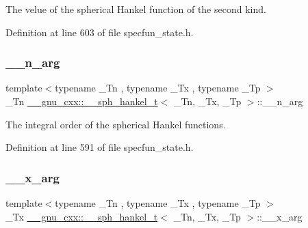 The velue of the spherical Hankel function of the second kind. 



Definition at line 603 of file specfun\+\_\+state.\+h.

\mbox{\label{struct____gnu__cxx_1_1____sph__hankel__t_a43f671e87375a9077262676564df20c5}} 
\subsubsection{\texorpdfstring{\+\_\+\+\_\+n\+\_\+arg}{\_\_n\_arg}}
{\footnotesize\ttfamily template$<$typename \+\_\+\+Tn , typename \+\_\+\+Tx , typename \+\_\+\+Tp $>$ \\
\+\_\+\+Tn \hyperlink{struct____gnu__cxx_1_1____sph__hankel__t}{\+\_\+\+\_\+gnu\+\_\+cxx\+::\+\_\+\+\_\+sph\+\_\+hankel\+\_\+t}$<$ \+\_\+\+Tn, \+\_\+\+Tx, \+\_\+\+Tp $>$\+::\+\_\+\+\_\+n\+\_\+arg}



The integral order of the spherical Hankel functions. 



Definition at line 591 of file specfun\+\_\+state.\+h.

\mbox{\label{struct____gnu__cxx_1_1____sph__hankel__t_a265ee0cdcca2d491c29b520a0fd4e4b3}} 
\subsubsection{\texorpdfstring{\+\_\+\+\_\+x\+\_\+arg}{\_\_x\_arg}}
{\footnotesize\ttfamily template$<$typename \+\_\+\+Tn , typename \+\_\+\+Tx , typename \+\_\+\+Tp $>$ \\
\+\_\+\+Tx \hyperlink{struct____gnu__cxx_1_1____sph__hankel__t}{\+\_\+\+\_\+gnu\+\_\+cxx\+::\+\_\+\+\_\+sph\+\_\+hankel\+\_\+t}$<$ \+\_\+\+Tn, \+\_\+\+Tx, \+\_\+\+Tp $>$\+::\+\_\+\+\_\+x\+\_\+arg}



